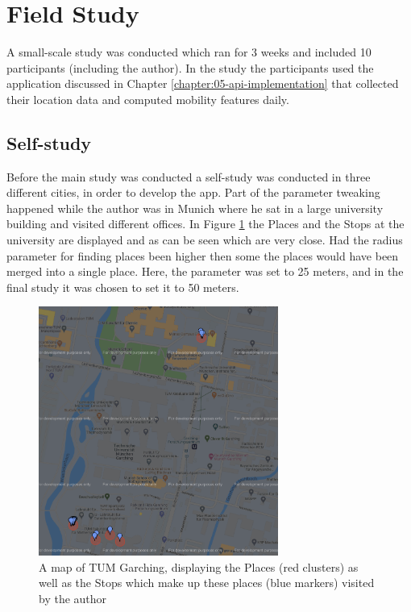 \section{Field Study}
A small-scale study was conducted which ran for 3 weeks and included 10 participants (including the author). In the study the participants used the application discussed in Chapter \ref{chapter:05-api-implementation} that collected their location data and computed mobility features daily.


\subsection{Self-study}
Before the main study was conducted a self-study was conducted in three different cities, in order to develop the app. Part of the parameter tweaking happened while the author was in Munich where he sat in a large university building and visited different offices. In Figure \ref{fig:tum-map} the Places and the Stops at the university are displayed and as can be seen which are very close. Had the radius parameter for finding places been higher then some the places would have been merged into a single place. Here, the parameter was set to 25 meters, and in the final study it was chosen to set it to 50 meters.

\begin{figure}
    \centering
    \includegraphics[width=0.7\textwidth]{images/map/map-tum.png}
    \caption{A map of TUM Garching, displaying the Places (red clusters) as well as the Stops which make up these places (blue markers) visited by the author}
    \label{fig:tum-map}
\end{figure}

